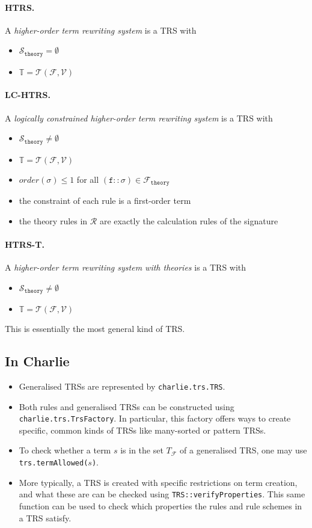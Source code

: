 \documentclass{lmcs}
\theoremstyle{theorem}\newtheorem{theorem}{Theorem}
\theoremstyle{theorem}\newtheorem{lemma}[theorem]{Lemma}
\theoremstyle{theorem}\newtheorem{corollary}[theorem]{Corollary}
\theoremstyle{definition}\newtheorem{definition}[theorem]{Definition}
\theoremstyle{definition}\newtheorem{example}[theorem]{Example}
\newcommand{\F}{\mathcal{F}}
\newcommand{\thF}{\mathcal{F}_{\mathtt{theory}}}
\newcommand{\V}{\mathcal{V}}
\newcommand{\thSorts}{\mathcal{S}_{\mathtt{theory}}}
\newcommand{\Terms}{\mathcal{T}}
\newcommand{\Rules}{\mathcal{R}}
\newcommand{\termsset}{\mathbb{T}}
\newcommand{\order}{\mathit{order}}
\newcommand{\atype}{\sigma}
\newcommand{\identifier}[1]{\mathtt{#1}}
\newcommand{\afun}{\identifier{f}}
\newcommand{\myparagraph}[1]{\paragraph{\textbf{#1.}}}
\begin{document}
\myparagraph{HTRS}
A \emph{higher-order term rewriting system} is a TRS with
\begin{itemize}
\item $\thSorts = \emptyset$
\item $\termsset = \Terms(\F,\V)$
\end{itemize}

\myparagraph{LC-HTRS}
A \emph{logically constrained higher-order term rewriting system} is a TRS with
\begin{itemize}
\item $\thSorts \neq \emptyset$
\item $\termsset = \Terms(\F,\V)$
\item $\order(\atype) \leq 1$ for all $(\afun :: \atype) \in \thF$
\item the constraint of each rule is a first-order term
\item the theory rules in $\Rules$ are exactly the calculation rules of the
  signature
\end{itemize}

\myparagraph{HTRS-T}
A \emph{higher-order term rewriting system with theories} is a TRS with
\begin{itemize}
\item $\thSorts \neq \emptyset$
\item $\termsset = \Terms(\F,\V)$
\end{itemize}

This is essentially the most general kind of TRS.

\subsection*{In Charlie}

\begin{itemize}
\item Generalised TRSs are represented by \texttt{charlie.trs.TRS}.
\item Both rules and generalised TRSs can be constructed using
  \texttt{charlie.trs.TrsFactory}.
  In particular, this factory offers ways to create specific, common kinds of
  TRSs like many-sorted or pattern TRSs.
\item To check whether a term $s$ is in the set $T_\F$ of a generalised TRS,
  one may use \texttt{trs.termAllowed($s$)}.
\item More typically, a TRS is created with specific restrictions on term
  creation, and what these are can be checked using
  \texttt{TRS::verifyProperties}.  This same function can be used to check
  which properties the rules and rule schemes in a TRS satisfy.
\end{itemize}
\end{document}

